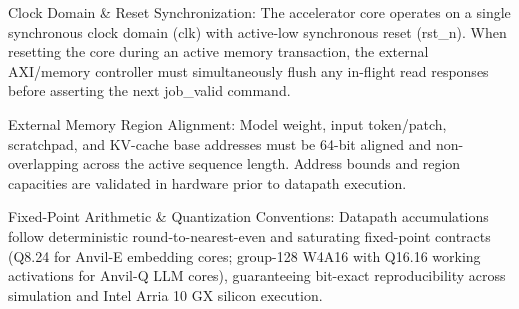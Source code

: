 \documentclass[11pt,a4paper]{article}
\begin{document}
Cloc\allowbreak{}k Doma\allowbreak{}in \& Rese\allowbreak{}t Sync\allowbreak{}hron\allowbreak{}izat\allowbreak{}ion: The acce\allowbreak{}lera\allowbreak{}tor core oper\allowbreak{}ates on a sing\allowbreak{}le sync\allowbreak{}hron\allowbreak{}ous cloc\allowbreak{}k doma\allowbreak{}in (\allowbreak{}clk)\allowbreak{} with acti\allowbreak{}ve-low sync\allowbreak{}hron\allowbreak{}ous rese\allowbreak{}t (\allowbreak{}rst\_\allowbreak{}n)\allowbreak{}. When rese\allowbreak{}ttin\allowbreak{}g the core duri\allowbreak{}ng an acti\allowbreak{}ve memo\allowbreak{}ry tran\allowbreak{}sact\allowbreak{}ion,\allowbreak{} the exte\allowbreak{}rnal AXI/\allowbreak{}memo\allowbreak{}ry cont\allowbreak{}roll\allowbreak{}er must simu\allowbreak{}ltan\allowbreak{}eous\allowbreak{}ly flus\allowbreak{}h any in-flig\allowbreak{}ht read resp\allowbreak{}onse\allowbreak{}s befo\allowbreak{}re asse\allowbreak{}rtin\allowbreak{}g the next job\_\allowbreak{}vali\allowbreak{}d comm\allowbreak{}and.


Exte\allowbreak{}rnal Memo\allowbreak{}ry Regi\allowbreak{}on Alig\allowbreak{}nmen\allowbreak{}t: Mode\allowbreak{}l weig\allowbreak{}ht,\allowbreak{} inpu\allowbreak{}t toke\allowbreak{}n/\allowbreak{}patc\allowbreak{}h,\allowbreak{} scra\allowbreak{}tchp\allowbreak{}ad,\allowbreak{} and KV-cach\allowbreak{}e base addr\allowbreak{}esse\allowbreak{}s must be 64-bit alig\allowbreak{}ned and non-over\allowbreak{}lapp\allowbreak{}ing acro\allowbreak{}ss the acti\allowbreak{}ve sequ\allowbreak{}ence leng\allowbreak{}th. Addr\allowbreak{}ess boun\allowbreak{}ds and regi\allowbreak{}on capa\allowbreak{}citi\allowbreak{}es are vali\allowbreak{}date\allowbreak{}d in hard\allowbreak{}ware prio\allowbreak{}r to data\allowbreak{}path exec\allowbreak{}utio\allowbreak{}n.


Fixe\allowbreak{}d-Poin\allowbreak{}t Arit\allowbreak{}hmet\allowbreak{}ic \& Quan\allowbreak{}tiza\allowbreak{}tion Conv\allowbreak{}enti\allowbreak{}ons: Data\allowbreak{}path accu\allowbreak{}mula\allowbreak{}tion\allowbreak{}s foll\allowbreak{}ow dete\allowbreak{}rmin\allowbreak{}isti\allowbreak{}c roun\allowbreak{}d-to-near\allowbreak{}est-even and satu\allowbreak{}rati\allowbreak{}ng fixe\allowbreak{}d-poin\allowbreak{}t cont\allowbreak{}ract\allowbreak{}s (\allowbreak{}Q8.24 for Anvi\allowbreak{}l-E embe\allowbreak{}ddin\allowbreak{}g core\allowbreak{}s; grou\allowbreak{}p-128 W4A1\allowbreak{}6 with Q16.16 work\allowbreak{}ing acti\allowbreak{}vati\allowbreak{}ons for Anvi\allowbreak{}l-Q LLM core\allowbreak{}s)\allowbreak{},\allowbreak{} guar\allowbreak{}ante\allowbreak{}eing bit-exac\allowbreak{}t repr\allowbreak{}oduc\allowbreak{}ibil\allowbreak{}ity acro\allowbreak{}ss simu\allowbreak{}lati\allowbreak{}on and Inte\allowbreak{}l Arri\allowbreak{}a 10 GX sili\allowbreak{}con exec\allowbreak{}utio\allowbreak{}n.
\end{document}

